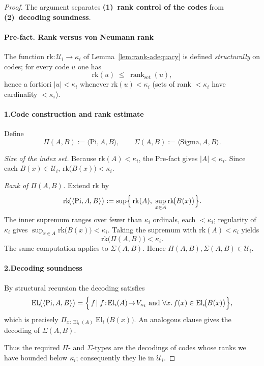 \documentclass[a4paper,11pt]{article}
\newcommand{\El}{\operatorname{El}}          %
\begin{document}
\begin{proof}
The argument separates
\textbf{(1)~rank control of the codes}
from
\textbf{(2)~decoding soundness}.

\smallskip
\paragraph*{Pre-fact.  Rank versus von Neumann rank}
The function $\mathrm{rk}\colon\mathcal U_{i}\to\kappa_{i}$
of Lemma~\ref{lem:rank-adequacy} is defined
\emph{structurally} on codes; for every code $u$ one has
\[
  \mathrm{rk}(u)
  \;\le\;
  \operatorname{rank}_{\text{set}}(u),
\]
hence a fortiori
$|u|<\kappa_{i}$ whenever $\mathrm{rk}(u)<\kappa_{i}$
(sets of rank $<\kappa_{i}$ have cardinality $<\kappa_{i}$).

\smallskip
\paragraph*{1.\;Code construction and rank estimate}
Define
\[
  \Pi(A,B):=\langle\mathrm{Pi},A,B\rangle,
  \qquad
  \Sigma(A,B):=\langle\mathrm{Sigma},A,B\rangle .
\]

\emph{Size of the index set.}
Because $\mathrm{rk}(A)<\kappa_{i}$,
the Pre-fact gives $|A|<\kappa_{i}$.
Since each $B(x)\in\mathcal U_{i}$,
$\mathrm{rk}\bigl(B(x)\bigr)<\kappa_{i}$.

\emph{Rank of $\Pi(A,B)$.}
Extend $\mathrm{rk}$ by
\[
  \mathrm{rk}\!\bigl(\langle\mathrm{Pi},A,B\rangle\bigr)
   :=\sup\Bigl\{\,
        \mathrm{rk}(A),\;
        \sup_{x\in A}\mathrm{rk}\!\bigl(B(x)\bigr)
      \Bigr\}.
\]
The inner supremum ranges over fewer than $\kappa_{i}$ ordinals,
each $<\kappa_{i}$; regularity of $\kappa_{i}$ gives
\(
  \sup_{x\in A}\mathrm{rk}\bigl(B(x)\bigr)<\kappa_{i}.
\)
Taking the supremum with $\mathrm{rk}(A)<\kappa_{i}$ yields
\[
  \mathrm{rk}\bigl(\Pi(A,B)\bigr)<\kappa_{i}.
\]
The same computation applies to $\Sigma(A,B)$.
Hence
\(
  \Pi(A,B),\Sigma(A,B)\in\mathcal U_{i}.
\)

\smallskip
\paragraph*{2.\;Decoding soundness}
By structural recursion the decoding satisfies
\[
  \El_{i}\!\bigl(\langle\mathrm{Pi},A,B\rangle\bigr)
   =\Bigl\{\,f\!\mid
       f\!:\!\El_{i}(A)\!\to\! V_{\kappa_{i}}
       \text{ and }\forall x.\,f(x)\in\El_{i}\!\bigl(B(x)\bigr)
     \Bigr\},
\]
which is precisely
$\Pi_{x:\El_{i}(A)}\El_{i}\!\bigl(B(x)\bigr)$.
An analogous clause gives the decoding of $\Sigma(A,B)$.

\smallskip
\noindent
Thus the required $\Pi$- and $\Sigma$-types are the decodings of
codes whose ranks we have bounded below $\kappa_{i}$; consequently
they lie in $\mathcal U_{i}$.
\end{proof}
\end{document}
